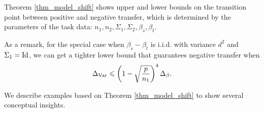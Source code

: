
Theorem \ref{thm_model_shift} shows upper and lower bounds on the transition point between positive and negative transfer, which is determined by the parameters of the task data: $n_1, n_2, \Sigma_1, \Sigma_2, \beta_s, \beta_t$.

As a remark, for the special case when $\beta_s - \beta_t$ is i.i.d. with variance $d^2$ and $\Sigma_1 = \operatorname{Id}$, we can get a tighter lower bound that guarantees negative transfer when
\begin{align}
	\Delta_{\operatorname{Var}} \leqslant \left({1 - \sqrt{\frac{p}{n_1}}}\right)^4 \Delta_{\beta}.
\end{align}

\medskip
We describe examples based on Theorem \ref{thm_model_shift} to show several conceptual insights.

